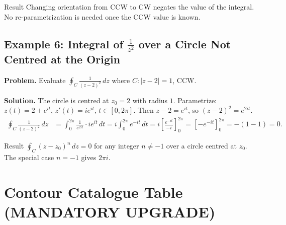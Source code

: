 \documentclass[12pt,a4paper]{article}
\begin{document}
\begin{learnbox}{Result}
Changing orientation from CCW to CW negates the value of the integral.
No re-parametrization is needed once the CCW value is known.
\end{learnbox}

\subsection*{Example 6: Integral of $\frac{1}{z^2}$ over a Circle Not Centred at the Origin}

\textbf{Problem.} Evaluate $\displaystyle\oint_C \frac{1}{(z-2)^2}\,dz$
where $C: |z-2|=1$, CCW.

\textbf{Solution.} The circle is centred at $z_0=2$ with radius $1$.
Parametrize: $z(t)=2+e^{it}$, $z'(t)=ie^{it}$, $t\in[0,2\pi]$.
Then $z-2=e^{it}$, so $(z-2)^2=e^{2it}$.
\begin{align*}
\oint_C \frac{1}{(z-2)^2}\,dz &= \int_0^{2\pi} \frac{1}{e^{2it}}\cdot ie^{it}\,dt
= i\int_0^{2\pi} e^{-it}\,dt
= i\left[\frac{e^{-it}}{-i}\right]_0^{2\pi}
= \left[-e^{-it}\right]_0^{2\pi}
= -(1-1) = 0.
\end{align*}

\begin{learnbox}{Result}
$\oint_C (z-z_0)^n\,dz = 0$ for any integer $n \neq -1$ over a circle centred
at $z_0$. The special case $n=-1$ gives $2\pi i$.
\end{learnbox}

\section{Contour Catalogue Table (MANDATORY UPGRADE)}
\end{document}

